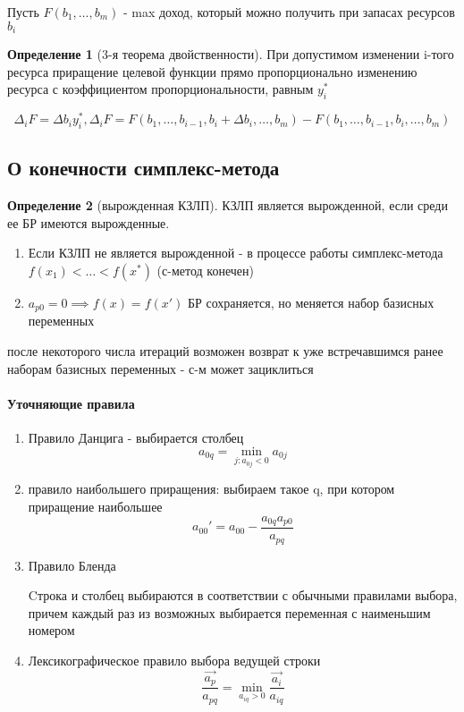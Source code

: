 \documentclass[a4paper]{article}
\theoremstyle{definition}
\newtheorem*{definition}{Определение}
\theoremstyle{remark}
\begin{document}
Пусть $F(b_1, \dots, b_m)$ - max доход, который можно получить при запасах ресурсов $b_i$

\begin{definition}[3-я теорема двойственности]
    При допустимом изменении i-того ресурса приращение целевой функции прямо пропорционально изменению ресурса с коэффициентом пропорциональности, равным $y_i^*$

    $$\Delta_i F = \Delta b_i y_i^*, \Delta_i F = F(b_1, \dots, b_{i-1}, b_i + \Delta b_i, \dots, b_m)-F(b_1, \dots, b_{i-1}, b_i, \dots, b_m)$$
\end{definition}
\subsection{О конечности симплекс-метода}
\begin{definition}[вырожденная КЗЛП]
    КЗЛП является вырожденной, если среди ее БР имеются вырожденные.
\end{definition}
\begin{enumerate}
    \item Если КЗЛП не является вырожденной - в процессе работы симплекс-метода $f(x_1) < \dots < f(x^*)$ (с-метод конечен)
    \item $a_{p0} = 0\implies f(x) = f(x')$ БР сохраняется, но меняется набор базисных переменных 
\end{enumerate}
после некоторого числа итераций возможен возврат к уже встречавшимся ранее наборам базисных переменных - с-м может зациклиться
\paragraph*{Уточняющие правила}
\begin{enumerate}
    \item Правило Данцига - выбирается столбец $$a_{0q} = \min_{j: a_{0j}< 0} a_{0j}$$
    \item правило наибольшего приращения: выбираем такое q, при котором приращение наибольшее
    $$a_{00}' = a_{00} - \frac{a_{0q} a_{p0}}{a_{pq}}$$
    \item Правило Бленда

    Cтрока и столбец выбираются в соответствии с обычными правилами выбора, причем каждый раз из возможных выбирается переменная с наименьшим номером
    \item Лексикографическое правило выбора ведущей строки
    $$\frac{\overrightarrow{a_p} }{a_{pq}}  = \min_{a_{iq}>0}\frac{\overrightarrow{a_i} }{a_{iq}}$$
\end{enumerate}
\end{document}
